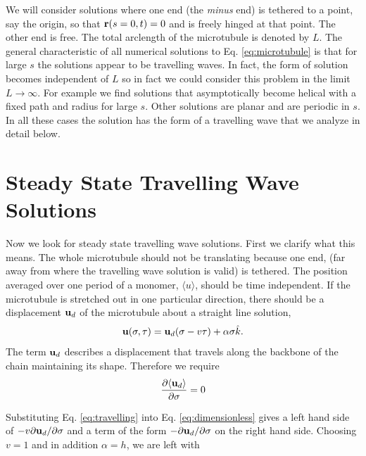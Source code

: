 \documentclass[11pt]{ucthesis}
\def\br{{\bf r}}
\def\bu{{\bf u}}
\begin{document}
We will consider solutions where one end (the {\em minus} end) is tethered to a point, say the origin, so that
$\br(s=0,t) = 0$ and is freely hinged at that point. The other end is free.
The total arclength of the microtubule is denoted by $L$.
The general characteristic of all numerical solutions to Eq. \ref{eq:microtubule} is that
for large $s$ the solutions appear to be travelling waves. In fact, the form of solution
becomes independent of $L$ so in fact we could consider this problem in the limit $L\rightarrow \infty$.
For example we find solutions that asymptotically become helical with a fixed path and radius for
large $s$. Other solutions are planar and are periodic in $s$. In all these cases the solution
has the form of a travelling wave that we analyze in detail below.

\section{Steady State Travelling Wave Solutions}

Now we look for steady state travelling wave solutions. First we clarify what this means.
The whole microtubule should not be translating because one end, (far away from where
the travelling wave solution is valid) is tethered. 
The position averaged over one period of a monomer, $\langle u \rangle$, should be  time independent.
If the microtubule is stretched out
in one particular direction, there should be a displacement $\bu_d$ of the microtubule about a straight
line solution,
\begin{equation}
\label{eq:travelling}
\bu(\sigma, \tau) = \bu_d(\sigma-v\tau) + \alpha \sigma {\hat k}.
\end{equation}
The term $\bu_d$ describes a displacement that travels along the backbone of the chain maintaining its shape.
Therefore we require
\begin{equation}
\label{eq:ud_constraint}
\frac{\partial \langle \bu_d \rangle}{\partial \sigma} = 0
\end{equation}

Substituting Eq. \ref{eq:travelling} into Eq. \ref{eq:dimensionless} gives a left hand side
of $-v \partial \bu_d/\partial \sigma$ and a term of the form $-\partial \bu_d/\partial \sigma$ on
the right hand side. Choosing $v = 1$ and in addition $\alpha = h$, we are left with
\end{document}
